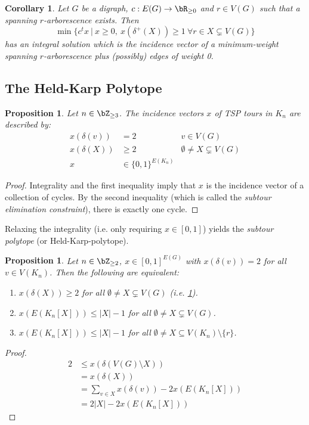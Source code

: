 \documentclass[11pt, a4paper]{article}
\newcommand{\abs}[1]{\left\lvert#1\right\rvert}
\newcommand{\set}[1]{\{#1\}}
\newtheorem{cor}[theorem]{Corollary}
\newtheorem{prop}[theorem]{Proposition}
\theoremstyle{remark}
\theoremstyle{definition}
\begin{document}
\begin{cor}
	Let $G$ be a digraph, $c: E(G)\to\bR_{\geq0}$ and $r\in V(G)$ such that
	a spanning $r$-arborescence exists. Then
	\[\min\set{c^tx\ |\ x\geq0,\ x(\delta^+(X))\geq1\ \forall r\in X\subsetneq V(G)}\]
	has an integral solution which is the incidence vector of a
	minimum-weight spanning $r$-arborescence plus (possibly) edges of
	weight 0.
\end{cor}

\subsection{The Held-Karp Polytope}

\begin{prop}\label{prop:subtour-polytope}
	Let $n\in\bZ_{\geq3}$. The incidence vectors $x$ of TSP tours in $K_n$ are
	described by:
	\begin{align*}
		x(\delta(v)) & =2                     & v\in V(G)                      \\
		x(\delta(X)) & \geq2                  & \emptyset\neq X\subsetneq V(G) \\
		x            & \in \set{0,1}^{E(K_n)}
	\end{align*}
\end{prop}
\begin{proof}
	Integrality and the first inequality imply that $x$ is the incidence
	vector of a collection of cycles. By the second inequality (which is
	called the \emph{subtour elimination constraint}), there is
	exactly one cycle.
\end{proof}
Relaxing the integrality (i.e. only requiring $x\in[0,1]$) yields the
\emph{subtour polytope} (or Held-Karp-polytope).

\begin{prop}
	Let $n\in\bZ_{\geq2}$, $x\in[0,1]^{E(G)}$ with $x(\delta(v))=2$ for all
	$v\in V(K_n)$. Then the following are equivalent:
	\begin{enumerate}
		\item $x(\delta(X))\geq2$ for all $\emptyset \neq X\subsetneq V(G)$
		(i.e. \ref{prop:subtour-polytope}).
		\item $x(E(K_n[X]))\leq \abs{X}-1$ for all $\emptyset\neq X\subsetneq V(G)$.
		\item $x(E(K_n[X]))\leq \abs{X}-1$ for all  $\emptyset\neq X\subseteq V(K_n)\setminus\set{r}$.
	\end{enumerate}
\end{prop}
\begin{proof}
	\begin{align*}
		2 & \leq x(\delta(V(G)\setminus X))          \\
		  & =x(\delta(X))                            \\
		  & =\sum_{v\in X}x(\delta(v))-2x(E(K_n[X])) \\
		  & =2\abs{X}-2x(E(K_n[X]))
	\end{align*}
\end{proof}
\end{document}
